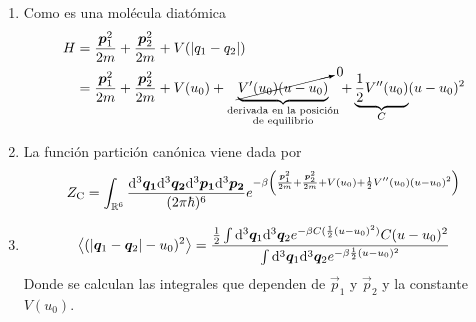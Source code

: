 \begin{sol}
\begin{enumerate}
	
\item 	Como es una molécula diatómica
	\begin{align}
  H&=\frac{\vec{p}_1^2}{2m}+\frac{\vec{p}_2^2}{2m}+V(|q_1-q_2|)\\
  &=\frac{\vec{p}_1^2}{2m}+\frac{\vec{p}_2^2}{2m}+V(u_0)+\underbrace{\cancelto{0}{V'(u_0)(u-u_0)}}_{\substack{\text{derivada en la posición}\\ \text{de equilibrio}}}+\underbrace{\frac{1}{2}V''(u_0)}_{C}(u-u_0)^2
\end{align}

\item La función partición canónica viene dada por
\begin{equation}
  \zc=\int_{\mathbb{R}^6}\frac{\dd^3\vec{q_1}\dd^3\vec{q_2}\dd^3\vec{p_1}\dd^3\vec{p_2}}{(2\p \hbar)^6}e^{-\b \left(\frac{\vec{p}_1^2}{2m}+\frac{\vec{p}_2^2}{2m}+V(u_0)+\frac{1}{2}V''(u_0)(u-u_0)^2\right)}
\end{equation}

\item 
\begin{equation}
  \ev{(|\vec{q}_1-\vec{q}_2|-u_0)^2}=\frac{\frac{1}{2}\int\dd^3\vec{q}_1\dd^3\vec{q}_2e^{-\b C(\frac{1}{2}(u-u_0)^2)}C(u-u_0)^2}{\int\dd^3\vec{q}_1\dd^3\vec{q}_2e^{-\b \frac{1}{2}(u-u_0)^2}}
\end{equation}
Donde se calculan las integrales que dependen de $\vec{p}_1$ y $\vec{p}_2$ y la constante $V(u_0)$.
\end{enumerate}
\end{sol}






























